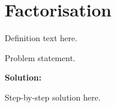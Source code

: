 \section{Factorisation}


\begin{definition}[Term]
Definition text here.
\end{definition}

\begin{example}
Problem statement.

\textbf{Solution:}

Step-by-step solution here.
\end{example}
